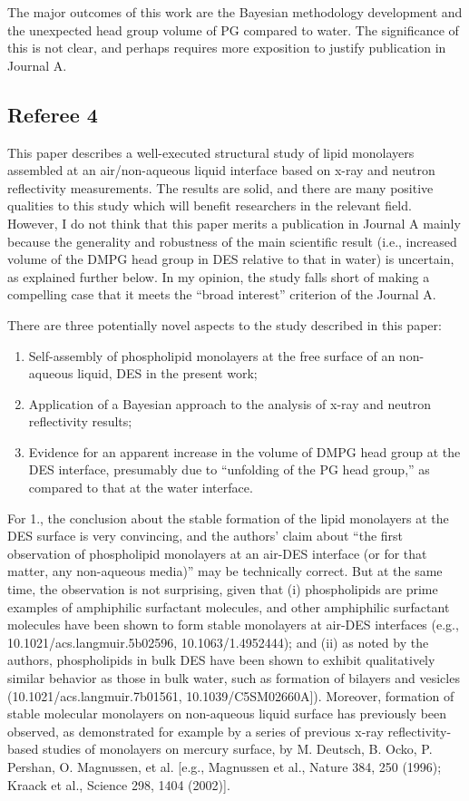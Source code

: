 \documentclass[amsmath,amssymb,twocolumn,superscriptaddress]{revtex4-1}
\begin{document}
The major outcomes of this work are the Bayesian methodology development and the unexpected head group volume of PG compared to water. The significance of this is not clear, and perhaps requires more exposition to justify publication in Journal A.

\subsection{Referee 4}
This paper describes a well-executed structural study of lipid monolayers assembled at an air/non-aqueous liquid interface based on x-ray and neutron reflectivity measurements. The results are solid, and there are many positive qualities to this study which will benefit researchers in the relevant field. However, I do not think that this paper merits a publication in Journal A mainly because the generality and robustness of the main scientific result (i.e., increased volume of the DMPG head group in DES relative to that in water) is uncertain, as explained further below. In my opinion, the study falls short of making a compelling case that it meets the ``broad interest'' criterion of the Journal A.

There are three potentially novel aspects to the study described in this paper:

\begin{enumerate}
\item Self-assembly of phospholipid monolayers at the free surface of an non-aqueous liquid, DES in the present work;

\item Application of a Bayesian approach to the analysis of x-ray and neutron reflectivity results;

\item Evidence for an apparent increase in the volume of DMPG head group at the DES interface, presumably due to ``unfolding of the PG head group,'' as compared to that at the water interface.
\end{enumerate}

For 1., the conclusion about the stable formation of the lipid monolayers at the DES surface is very convincing, and the authors’ claim about ``the first observation of phospholipid monolayers at an air-DES interface (or for that matter, any non-aqueous media)'' may be technically correct. But at the same time, the observation is not surprising, given that (i) phospholipids are prime examples of amphiphilic surfactant molecules, and other amphiphilic surfactant molecules have been shown to form stable monolayers at air-DES interfaces (e.g., 10.1021/acs.langmuir.5b02596, 10.1063/1.4952444); and (ii) as noted by the authors, phospholipids in bulk DES have been shown to exhibit qualitatively similar behavior as those in bulk water, such as formation of bilayers and vesicles (10.1021/acs.langmuir.7b01561, 10.1039/C5SM02660A]). Moreover, formation of stable molecular monolayers on non-aqueous liquid surface has previously been observed, as demonstrated for example by a series of previous x-ray reflectivity-based studies of monolayers on mercury surface, by M. Deutsch, B. Ocko, P. Pershan, O. Magnussen, et al. [e.g., Magnussen et al., Nature 384, 250 (1996); Kraack et al., Science 298, 1404 (2002)].
\end{document}
